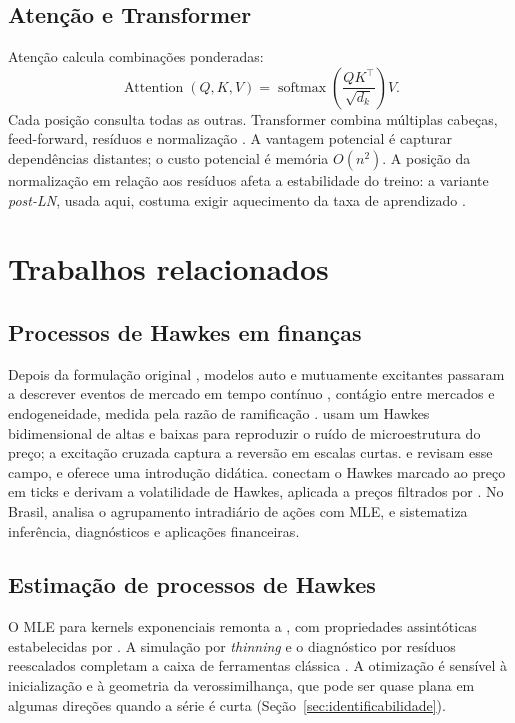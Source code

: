 \documentclass[12pt,a4paper,openany]{report}
\begin{document}
\section{Atenção e Transformer}

Atenção calcula combinações ponderadas:
\[
 \operatorname{Attention}(Q,K,V)=
 \operatorname{softmax}\left(\frac{QK^\top}{\sqrt{d_k}}\right)V.
\]
Cada posição consulta todas as outras. Transformer combina múltiplas cabeças,
feed-forward, resíduos e normalização \citep{vaswani2017}. A vantagem potencial é
capturar dependências distantes; o custo potencial é memória \(O(n^2)\). A posição da
normalização em relação aos resíduos afeta a estabilidade do treino: a variante
\emph{post-LN}, usada aqui, costuma exigir aquecimento da taxa de aprendizado
\citep{xiong2020}.

\chapter{Trabalhos relacionados}

\section{Processos de Hawkes em finanças}

Depois da formulação original \citep{hawkes1971,hawkes1971b}, modelos auto e
mutuamente excitantes passaram a descrever eventos de mercado em tempo contínuo
\citep{bowsher2007,embrechts2011}, contágio entre mercados \citep{aitsahalia2015} e
endogeneidade, medida pela razão de ramificação \citep{filimonov2012,hardiman2013}.
\citet{bacry2013} usam um Hawkes bidimensional de altas e baixas para reproduzir o
ruído de microestrutura do preço; a excitação cruzada captura a reversão em escalas
curtas. \citet{bacry2015} e \citet{hawkes2018} revisam esse campo, e
\citet{mutoke2011} oferece uma introdução didática. \citet{leeseo2017} conectam o
Hawkes marcado ao preço em ticks e derivam a volatilidade de Hawkes, aplicada a preços
filtrados por \citet{lee2024}. No Brasil, \citet{primo2018} analisa o agrupamento
intradiário de ações com MLE, e \citet{silva2026} sistematiza inferência, diagnósticos
e aplicações financeiras.

\section{Estimação de processos de Hawkes}

O MLE para kernels exponenciais remonta a \citet{ozaki1979}, com propriedades
assintóticas estabelecidas por \citet{ogata1978}. A simulação por \emph{thinning}
\citep{ogata1981} e o diagnóstico por resíduos reescalados \citep{ogata1988,brown2002}
completam a caixa de ferramentas clássica \citep{laub2021}. A otimização é sensível à
inicialização e à geometria da verossimilhança, que pode ser quase plana em algumas
direções quando a série é curta (Seção~\ref{sec:identificabilidade}).
\end{document}
